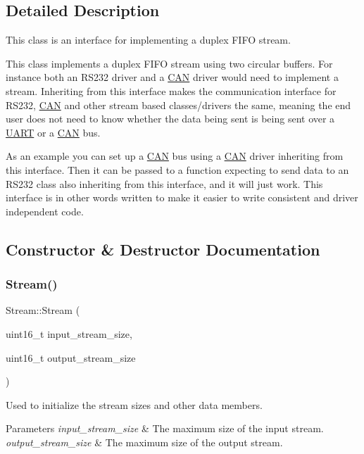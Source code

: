 \subsection{Detailed Description}
This class is an interface for implementing a duplex F\+I\+FO stream. 

This class implements a duplex F\+I\+FO stream using two circular buffers. For instance both an R\+S232 driver and a \hyperlink{class_c_a_n}{C\+AN} driver would need to implement a stream. Inheriting from this interface makes the communication interface for R\+S232, \hyperlink{class_c_a_n}{C\+AN} and other stream based classes/drivers the same, meaning the end user does not need to know whether the data being sent is being sent over a \hyperlink{class_u_a_r_t}{U\+A\+RT} or a \hyperlink{class_c_a_n}{C\+AN} bus.

As an example you can set up a \hyperlink{class_c_a_n}{C\+AN} bus using a \hyperlink{class_c_a_n}{C\+AN} driver inheriting from this interface. Then it can be passed to a function expecting to send data to an R\+S232 class also inheriting from this interface, and it will just work. This interface is in other words written to make it easier to write consistent and driver independent code. 

\subsection{Constructor \& Destructor Documentation}
\hypertarget{class_stream_a2b738d6f4d3059de2ae3d444d68663bf}{}\label{class_stream_a2b738d6f4d3059de2ae3d444d68663bf} 
\subsubsection{\texorpdfstring{Stream()}{Stream()}}
{\footnotesize\ttfamily Stream\+::\+Stream (\begin{DoxyParamCaption}\item[{uint16\+\_\+t}]{input\+\_\+stream\+\_\+size,  }\item[{uint16\+\_\+t}]{output\+\_\+stream\+\_\+size }\end{DoxyParamCaption})}

Used to initialize the stream sizes and other data members. 
\begin{DoxyParams}{Parameters}
{\em input\+\_\+stream\+\_\+size} & The maximum size of the input stream. \\
\hline
{\em output\+\_\+stream\+\_\+size} & The maximum size of the output stream. \\
\hline
\end{DoxyParams}


